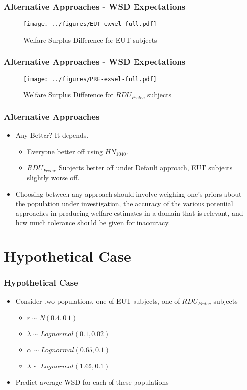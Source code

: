 \documentclass{beamer}
\begin{document}
\begin{frame}
\frametitle{Alternative Approaches - WSD Expectations}
	\begin{figure}[ht!]
		\center
		\caption{Welfare Surplus Difference for EUT subjects}
		\texttt{[image: ../figures/EUT-exwel-full.pdf]}
		\label{fig:exwel-eut}
	\end{figure}
\end{frame}

\begin{frame}
\frametitle{Alternative Approaches - WSD Expectations}
\begin{figure}[ht!]
	\center
	\caption{Welfare Surplus Difference for $\mathit{RDU_{Prelec}}$ subjects}
	\texttt{[image: ../figures/PRE-exwel-full.pdf]}
	\label{fig:exwel-pre}
\end{figure}
\end{frame}

\begin{frame}
\frametitle{Alternative Approaches}
\begin{itemize}
	\item Any Better? It depends.
		\begin{itemize}
			\item Everyone better off using ${HN}_{1040}$.
			\item $\mathit{RDU_{Prelec}}$ Subjects better off under Default approach, EUT subjects slightly worse off.
		\end{itemize}
	\item Choosing between any approach should involve weighing one's priors about the population under investigation, the accuracy of the various potential approaches in producing welfare estimates in a domain that is relevant, and how much tolerance should be given for inaccuracy.
\end{itemize}
\end{frame}

\section{Hypothetical Case}
\begin{frame}
\frametitle{Hypothetical Case}
\begin{itemize}
	\item Consider two populations, one of EUT subjects, one of $\mathit{RDU_{Prelec}}$ subjects
		\begin{itemize}
			\item $r       \sim \mathit{N}(0.4, 0.1)$
			\item $\lambda \sim \mathit{Lognormal}(0.1, 0.02)$
			\item $\alpha  \sim \mathit{Lognormal}(0.65, 0.1)$
			\item $\lambda \sim \mathit{Lognormal}(1.65, 0.1)$
		\end{itemize}
	\item Predict average WSD for each of these populations
\end{itemize}
\end{frame}
\end{document}
